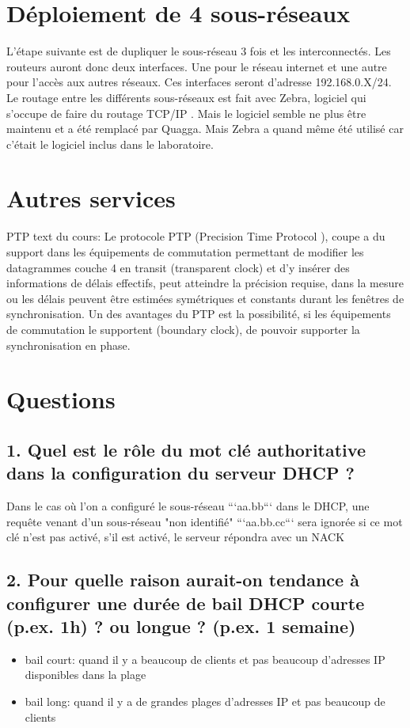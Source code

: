 \documentclass{article}
\begin{document}
\section{Déploiement de 4 sous-réseaux}

L'étape suivante est de dupliquer le sous-réseau 3 fois et les interconnectés. Les routeurs auront donc deux interfaces. Une pour le réseau internet et une autre pour l'accès aux autres réseaux. Ces interfaces seront d'adresse 192.168.0.X/24.\\

Le routage entre les différents sous-réseaux est fait avec Zebra, logiciel qui s'occupe de faire du routage TCP/IP \cite{Zebra}. Mais le logiciel semble ne plus être maintenu et a été remplacé par Quagga. Mais Zebra a quand même été utilisé car c'était le logiciel inclus dans le laboratoire.

\section{Autres services}

PTP text du cours:
Le protocole PTP (Precision Time Protocol ), coupe a du support dans les équipements de commutation permettant de modifier les datagrammes couche 4 en transit (transparent clock) et d'y insérer des informations de délais effectifs, peut atteindre la précision requise, dans la mesure ou les délais peuvent être estimées symétriques et constants durant les fenêtres de synchronisation. Un des avantages du
PTP est la possibilité, si les équipements de commutation le supportent (boundary clock), de pouvoir supporter la synchronisation en phase.

\section{Questions}

\subsection*{1. Quel est le rôle du mot clé authoritative dans la configuration du serveur DHCP ?}
Dans le cas où l'on a configuré le sous-réseau ```aa.bb``` dans le DHCP, une requête venant d'un sous-réseau "non identifié" ```aa.bb.cc``` sera ignorée si ce mot clé n'est pas activé, s'il est activé, le serveur répondra avec un NACK

\subsection*{2. Pour quelle raison aurait-on tendance à configurer une durée de bail DHCP courte (p.ex. 1h) ? ou longue ? (p.ex. 1 semaine)}
\begin{itemize}
\item bail court: quand il y a beaucoup de clients et pas beaucoup d'adresses IP disponibles dans la plage
\item bail long: quand il y a de grandes plages d'adresses IP et pas beaucoup de clients
\end{itemize}
\end{document}
